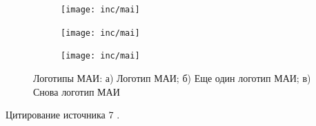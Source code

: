\begin{figure}
  \begin{subfigure}[t]{0.3\linewidth}
    \centering
    \texttt{[image: inc/mai]}
    \caption{}
  \end{subfigure}
  \hfill
  \begin{subfigure}[t]{0.3\linewidth}
    \centering
    \texttt{[image: inc/mai]}
    \caption{}
  \end{subfigure}
  \hfill
  \begin{subfigure}[t]{0.3\linewidth}
    \centering
    \texttt{[image: inc/mai]}
    \caption{}
  \end{subfigure}
  \caption{Логотипы МАИ: а) Логотип МАИ; б) Еще один логотип МАИ; в) Снова логотип МАИ}
  \label{fig:fig02}
\end{figure}

Цитирование источника 7 \cite{Wikipedia7}.
